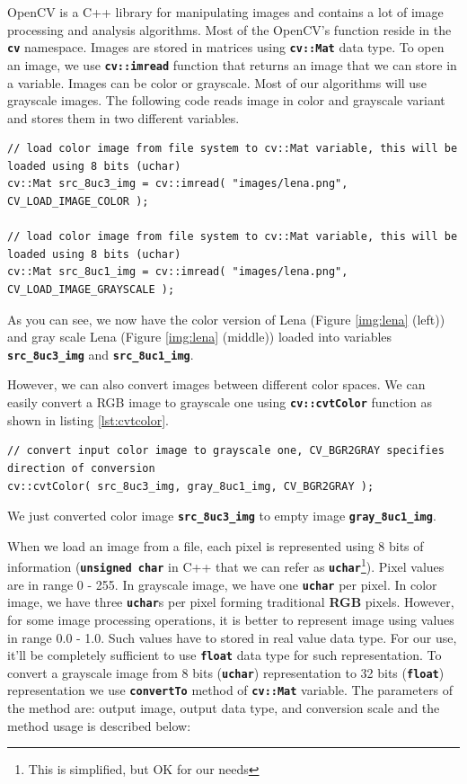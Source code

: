 \documentclass[10pt]{article}
\newcommand{\code}[1]{\textbf{\texttt{#1}}}
\begin{document}
OpenCV is a C++ library for manipulating images and contains a lot of image processing and analysis algorithms.
Most of the OpenCV's function reside in the \code{cv} namespace. Images are stored in matrices using \code{cv::Mat} data type.
To open an image, we use \code{cv::imread} function that returns an image that we can store in a variable.
Images can be color or grayscale. Most of our algorithms will use grayscale images.
The following code reads image in color and grayscale variant and stores them in two different variables.

\begin{lstlisting}[style=CStyle,caption={Reading image.},label={lst:read_image}]
// load color image from file system to cv::Mat variable, this will be loaded using 8 bits (uchar)
cv::Mat src_8uc3_img = cv::imread( "images/lena.png", CV_LOAD_IMAGE_COLOR );

// load color image from file system to cv::Mat variable, this will be loaded using 8 bits (uchar)
cv::Mat src_8uc1_img = cv::imread( "images/lena.png", CV_LOAD_IMAGE_GRAYSCALE );
\end{lstlisting}

As you can see, we now have the color version of Lena (Figure \ref{img:lena} (left)) and gray scale Lena (Figure \ref{img:lena} (middle))
loaded into variables \code{src\_8uc3\_img} and \code{src\_8uc1\_img}.

However, we can also convert images between different color spaces. We can easily convert a RGB image to grayscale one using \code{cv::cvtColor}
function as shown in listing \ref{lst:cvtcolor}.

\begin{lstlisting}[style=CStyle,caption={Reading image.},label={lst:cvtcolor}]
// convert input color image to grayscale one, CV_BGR2GRAY specifies direction of conversion
cv::cvtColor( src_8uc3_img, gray_8uc1_img, CV_BGR2GRAY );
\end{lstlisting}

We just converted color image \code{src\_8uc3\_img} to empty image \code{gray\_8uc1\_img}.

When we load an image from a file, each pixel is represented using 8 bits of information (\code{unsigned char} in C++ that we can refer as
\code{uchar}\footnote{This is simplified, but OK for our needs}). Pixel values are in range 0 - 255. In grayscale image, we have one \code{uchar} per pixel.
In color image, we have three \code{uchar}s per pixel forming traditional \textbf{RGB} pixels.
However, for some image processing operations, it is better to represent image using values in range 0.0 - 1.0.
Such values have to stored in real value data type. For our use, it'll be completely sufficient to use \code{float} data type for such representation.
To convert a grayscale image from 8 bits (\code{uchar}) representation to 32 bits (\code{float}) representation we use \code{convertTo} method of \code{cv::Mat} variable.
The parameters of the method are: output image, output data type, and conversion scale and the method usage is described below:
\end{document}
